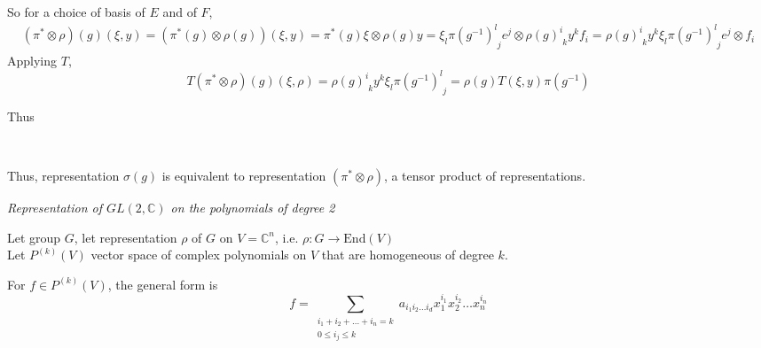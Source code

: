 \documentclass[10pt]{amsart}
\newcommand{\exercisehead}[1]
  { \smallskip
   \noindent{\small\bf Exercise #1.}
  }
\begin{document}
\begin{multicols*}{2}
\begin{enumerate}
So for a choice of basis of $E$ and of $F$, 
\[
\begin{gathered}
  (\pi^*\otimes \rho)(g)(\xi,y) = (\pi^*(g)\otimes \rho(g))(\xi,y) = \pi^*(g)\xi \otimes \rho(g)y = \xi_l \pi(g^{-1})^l_{\,\,j} e^j \otimes \rho(g)^i_{\,\,k}y^k f_i = \rho(g)^i_{\,\,k}y^k \xi_l \pi(g^{-1})^l_{\,\,j} e^j \otimes f_i
\end{gathered}
\]
Applying $T$,
\[
T(\pi^*\otimes \rho)(g)(\xi,\rho) = \rho(g)^i_{\,\,k} y^k \xi_l \pi(g^{-1})^l_{\,\,j} = \rho(g)T(\xi,y) \pi(g^{-1})
\]

Thus 
 \quad \quad \quad \, 
Thus, representation $\sigma(g)$ is equivalent to representation $(\pi^*\otimes \rho)$, a tensor product of representations.  

\end{enumerate}

\exercisehead{2.15} \emph{Representation of $GL(2, \mathbb{C})$ on the polynomials of degree 2}

Let group $G$, let representation $\rho$ of $G$ on $V= \mathbb{C}^n$, i.e. $\rho : G \to \text{End}(V)$ \\
Let $P^{(k)}(V)$ vector space of complex polynomials on $V$ that are homogeneous of degree $k$. 

For $f\in P^{(k)}(V)$, the general form is 
\[
f = \sum_{ \substack{ i_1 + i_2 + \dots + i_n = k \\ 0 \leq i_j \leq k } } a_{i_1 i_2 \dots i_d} x_1^{i_1} x_2^{i_2} \dots x_n^{i_n}
\]


\end{multicols*}
\end{document}
